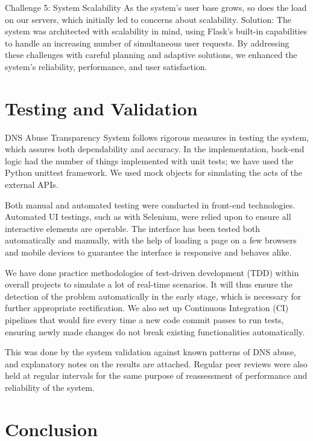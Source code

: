 Challenge 5: System Scalability
As the system's user base grows, so does the load on our servers, which initially led to concerns about scalability.
Solution: The system was architected with scalability in mind, using Flask's built-in capabilities to handle an increasing number of simultaneous user requests. 
By addressing these challenges with careful planning and adaptive solutions, we enhanced the system's reliability, performance, and user satisfaction.

\section{Testing and Validation}

DNS Abuse Transparency System follows rigorous measures in testing the system, which assures both dependability and accuracy. In the implementation, back-end logic had the number of things implemented with unit tests; we have used the Python unittest framework. We used mock objects for simulating the acts of the external APIs.

Both manual and automated testing were conducted in front-end technologies. Automated UI testings, such as with Selenium, were relied upon to ensure all interactive elements are operable. The interface has been tested both automatically and manually, with the help of loading a page on a few browsers and mobile devices to guarantee the interface is responsive and behaves alike.

We have done practice methodologies of test-driven development (TDD) within overall projects to simulate a lot of real-time scenarios. It will thus ensure the detection of the problem automatically in the early stage, which is necessary for further appropriate rectification. We also set up Continuous Integration (CI) pipelines that would fire every time a new code commit passes to run tests, ensuring newly made changes do not break existing functionalities automatically.

This was done by the system validation against known patterns of DNS abuse, and explanatory notes on the results are attached. Regular peer reviews were also held at regular intervals for the same purpose of reassessment of performance and reliability of the system.


\section{Conclusion}

